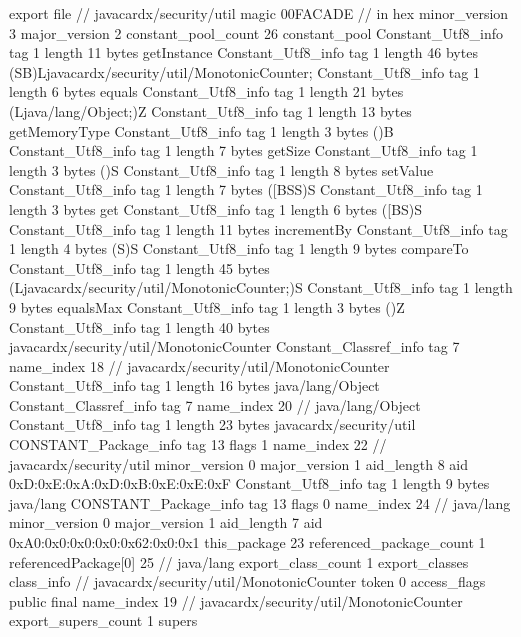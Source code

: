 export file {		// javacardx/security/util
	magic	00FACADE		 // in hex
	minor_version	3
	major_version	2
	constant_pool_count	26
	constant_pool {
		Constant_Utf8_info {
			tag	1
			length	11
			bytes	getInstance
		}
		Constant_Utf8_info {
			tag	1
			length	46
			bytes	(SB)Ljavacardx/security/util/MonotonicCounter;
		}
		Constant_Utf8_info {
			tag	1
			length	6
			bytes	equals
		}
		Constant_Utf8_info {
			tag	1
			length	21
			bytes	(Ljava/lang/Object;)Z
		}
		Constant_Utf8_info {
			tag	1
			length	13
			bytes	getMemoryType
		}
		Constant_Utf8_info {
			tag	1
			length	3
			bytes	()B
		}
		Constant_Utf8_info {
			tag	1
			length	7
			bytes	getSize
		}
		Constant_Utf8_info {
			tag	1
			length	3
			bytes	()S
		}
		Constant_Utf8_info {
			tag	1
			length	8
			bytes	setValue
		}
		Constant_Utf8_info {
			tag	1
			length	7
			bytes	([BSS)S
		}
		Constant_Utf8_info {
			tag	1
			length	3
			bytes	get
		}
		Constant_Utf8_info {
			tag	1
			length	6
			bytes	([BS)S
		}
		Constant_Utf8_info {
			tag	1
			length	11
			bytes	incrementBy
		}
		Constant_Utf8_info {
			tag	1
			length	4
			bytes	(S)S
		}
		Constant_Utf8_info {
			tag	1
			length	9
			bytes	compareTo
		}
		Constant_Utf8_info {
			tag	1
			length	45
			bytes	(Ljavacardx/security/util/MonotonicCounter;)S
		}
		Constant_Utf8_info {
			tag	1
			length	9
			bytes	equalsMax
		}
		Constant_Utf8_info {
			tag	1
			length	3
			bytes	()Z
		}
		Constant_Utf8_info {
			tag	1
			length	40
			bytes	javacardx/security/util/MonotonicCounter
		}
		Constant_Classref_info {
			tag	7
			name_index	18		// javacardx/security/util/MonotonicCounter
		}
		Constant_Utf8_info {
			tag	1
			length	16
			bytes	java/lang/Object
		}
		Constant_Classref_info {
			tag	7
			name_index	20		// java/lang/Object
		}
		Constant_Utf8_info {
			tag	1
			length	23
			bytes	javacardx/security/util
		}
		CONSTANT_Package_info {
			tag	13
			flags	1
			name_index	22		// javacardx/security/util
			minor_version	0
			major_version	1
			aid_length	8
			aid	0xD:0xE:0xA:0xD:0xB:0xE:0xE:0xF
		}
		Constant_Utf8_info {
			tag	1
			length	9
			bytes	java/lang
		}
		CONSTANT_Package_info {
			tag	13
			flags	0
			name_index	24		// java/lang
			minor_version	0
			major_version	1
			aid_length	7
			aid	0xA0:0x0:0x0:0x0:0x62:0x0:0x1
		}
	}
	this_package	23
	referenced_package_count	1
	referencedPackage[0]	25		// java/lang
	export_class_count	1
	export_classes {
		class_info {		// javacardx/security/util/MonotonicCounter
			token	0
			access_flags	public final
			name_index	19		// javacardx/security/util/MonotonicCounter
			export_supers_count	1
			supers {
}}}}
